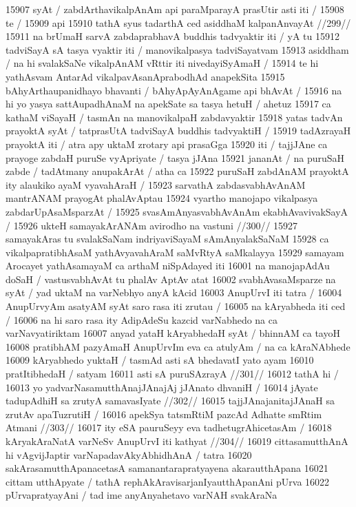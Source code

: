 15907 syAt / zabdArthavikalpAnAm api paraMparayA prasUtir asti iti / 
15908 	te / 
15909 api  
15910 	tathA syus tadarthA ced asiddhaM kalpanAnvayAt //299//  
15911 na brUmaH sarvA zabdaprabhavA buddhis tadvyaktir iti / yA tu  
15912 tadviSayA sA tasya vyaktir iti / manovikalpasya tadviSayatvam  
15913 asiddham / na hi svalakSaNe vikalpAnAM vRttir iti nivedayiSyAmaH /  
15914 te hi yathAsvam AntarAd vikalpavAsanAprabodhAd anapekSita  
15915 bAhyArthaupanidhayo bhavanti / bAhyApAyAnAgame api bhAvAt / 
15916 na hi yo yasya sattAupadhAnaM na apekSate sa tasya hetuH / ahetuz
15917 ca kathaM viSayaH / tasmAn na manovikalpaH zabdavyaktir 
15918 yatas tadvAn prayoktA syAt / tatprasUtA tadviSayA buddhis tadvyaktiH /
15919 tadAzrayaH prayoktA iti / atra apy uktaM zrotary api prasaGga 
15920 iti / tajjJAne ca prayoge zabdaH puruSe vyApriyate / tasya jJAna  
15921 jananAt / na puruSaH zabde / tadAtmany anupakArAt / atha ca  
15922 puruSaH zabdAnAM prayoktA ity alaukiko ayaM vyavahAraH /  
15923 sarvathA zabdasvabhAvAnAM mantrANAM prayogAt phalAvAptau 
15924 vyartho manojapo vikalpasya zabdarUpAsaMsparzAt / 
15925 	svasAmAnyasvabhAvAnAm ekabhAvavivakSayA /  
15926 	ukteH samayakArANAm avirodho na vastuni //300// 
15927 samayakAras tu svalakSaNam indriyaviSayaM sAmAnyalakSaNaM 
15928 ca vikalpapratibhAsaM yathAvyavahAraM saMvRtyA saMkalayya  
15929 samayam Arocayet yathAsamayaM ca arthaM niSpAdayed iti 
16001 na manojapAdAu doSaH / vastusvabhAvAt tu phalAv AptAv atat 
16002 svabhAvasaMsparze na syAt / yad uktaM na varNebhyo anyA kAcid  
16003 AnupUrvI iti tatra /
16004 	AnupUrvyAm asatyAM syAt saro rasa iti zrutau /
16005 	na kAryabheda iti ced / 
16006 na hi saro rasa ity AdipAdeSu kazcid varNabhedo na ca varNavyatiriktam
16007 anyad yataH kAryabhedaH syAt / bhinnAM ca tayoH  
16008 pratibhAM pazyAmaH AnupUrvIm eva ca atulyAm / na ca kAraNAbhede  
16009 kAryabhedo yuktaH / tasmAd asti sA bhedavatI yato ayam
16010 pratItibhedaH / satyam  
16011 	asti sA puruSAzrayA //301// 
16012 tathA hi /
16013 	yo yadvarNasamutthAnajJAnajAj jJAnato dhvaniH /
16014 	jAyate tadupAdhiH sa zrutyA samavasIyate //302// 
16015 	tajjJAnajanitajJAnaH sa zrutAv apaTuzrutiH /
16016 	apekSya tatsmRtiM pazcAd Adhatte smRtim Atmani //303//  
16017 	ity eSA pauruSeyy eva tadhetugrAhicetasAm /  
16018 	kAryakAraNatA varNeSv AnupUrvI iti kathyat //304// 
16019 cittasamutthAnA hi vAgvijJaptir varNapadavAkyAbhidhAnA / tatra
16020 sakArasamutthApanacetasA samanantarapratyayena akarautthApana  
16021 cittam utthApyate / tathA rephAkAravisarjanIyautthApanAni pUrva
16022 pUrvapratyayAni / tad ime anyAnyahetavo varNAH svakAraNa
